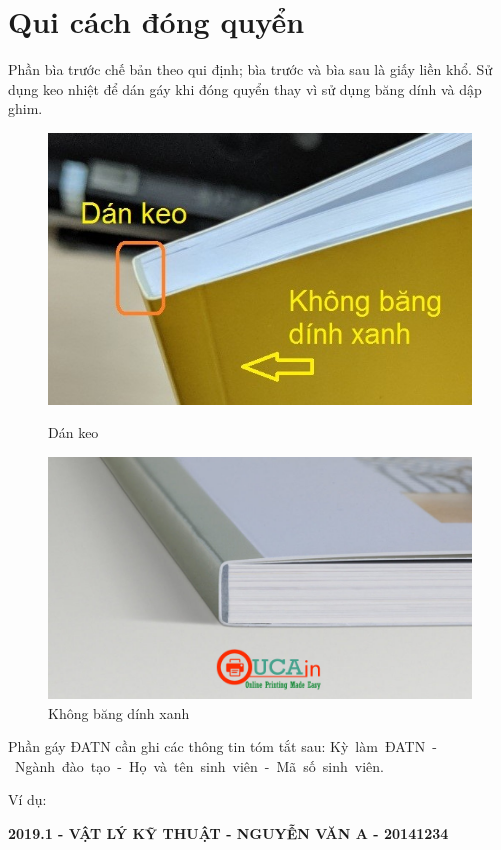 \section{Qui cách đóng quyển}
\label{sec:dongquyen}
	\quad Phần bìa trước chế bản theo qui định; bìa trước và bìa sau là giấy liền khổ. Sử dụng keo nhiệt để dán gáy khi đóng quyển thay vì sử dụng băng dính và dập ghim.\newline
	\begin{figure}[h]
	\centering
		\includegraphics[scale=1]{figures/fig1}
		\caption{Dán keo}
		
		\includegraphics[scale=0.3]{figures/fig2}
		\caption{Không băng dính xanh}
	\end{figure}
	
Phần gáy ĐATN cần ghi các thông tin tóm tắt sau:
Kỳ~làm~ĐATN~-~Ngành~đào~tạo~-~Họ~và~tên~sinh~viên~-~Mã~số~sinh~viên.
\vspace{2cm}

Ví dụ:

\textbf{2019.1 - VẬT LÝ KỸ THUẬT - NGUYỄN VĂN A - 20141234}

